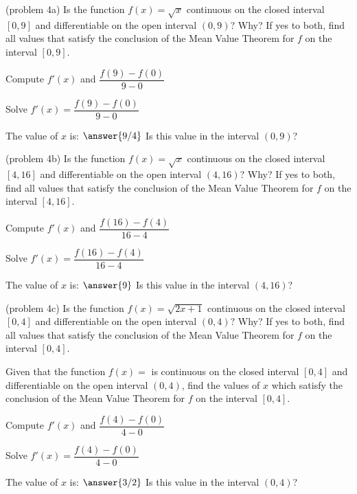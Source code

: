 \documentclass[handout]{ximera}
\begin{document}
\begin{problem}(problem 4a)
  Is the function $f(x) = \sqrt x$ continuous on the closed interval $[0,9]$ and differentiable on the open interval $(0,9)$? Why?
  If yes to both, find all values that satisfy the conclusion of the Mean Value Theorem for $f$ on the interval $[0,9]$.
	
    \begin{hint}
      Compute $f'(x)$ and $\dfrac{f(9) - f(0)}{9-0}$
    \end{hint}
		\begin{hint}
		  Solve $f'(x) = \dfrac{f(9) - f(0)}{9-0}$
		\end{hint}
		
		The value of $x$ is:
		 $\answer{9/4}$
     Is this value in the interval $(0,9)$?
\end{problem}


\begin{problem}(problem 4b)
  Is the function $f(x) = \sqrt x$ continuous on the closed interval $[4,16]$ and differentiable on the open interval $(4,16)$? Why?
  If yes to both, find all values that satisfy the conclusion of the Mean Value Theorem for $f$ on the interval $[4,16]$.
	
    \begin{hint}
      Compute $f'(x)$ and $\dfrac{f(16) - f(4)}{16-4}$
    \end{hint}
		\begin{hint}
		  Solve $f'(x) = \dfrac{f(16) - f(4)}{16-4}$
		\end{hint}
		
		The value of $x$ is:
		 $\answer{9}$
     Is this value in the interval $(4,16)$?
\end{problem}


\begin{problem}(problem 4c)
  Is the function $f(x) = \sqrt{2x+1}$ continuous on the closed interval $[0,4]$ and differentiable on the open interval $(0,4)$? Why?
  If yes to both, find all values that satisfy the conclusion of the Mean Value Theorem for $f$ on the interval $[0,4]$.


  Given that the function $f(x) = $ is continuous on the closed interval $[0,4]$ and differentiable on the open interval $(0,4)$,
  find the values of $x$ which satisfy the conclusion of the Mean Value Theorem for $f$ on the interval $[0,4]$.
	
    \begin{hint}
      Compute $f'(x)$ and $\dfrac{f(4) - f(0)}{4-0}$
    \end{hint}
		\begin{hint}
		  Solve $f'(x) = \dfrac{f(4) - f(0)}{4-0}$
		\end{hint}
		
		The value of $x$ is:
		 $\answer{3/2}$
     Is this value in the interval $(0,4)$?
\end{problem}
\end{document}
